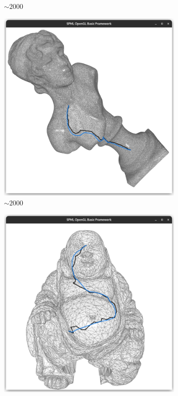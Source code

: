 \documentclass{stdlocal}
\begin{document}
\begin{figure}
\begin{subfigure}[b]{0.24\linewidth}
    \caption{$\sim 2000$}
  \end{subfigure}
  \begin{subfigure}[b]{0.24\linewidth}
    \centering
    \includegraphics[width=\linewidth,trim={15px 20 15 50},clip]{images/sappho-smooth-1.png}
    \caption{$\sim 2000$}
  \end{subfigure}
  \begin{subfigure}[b]{0.24\linewidth}
    \centering
    \includegraphics[width=\linewidth,trim={15px 20 15 50},clip]{images/buddha-smooth-1.png}

\end{subfigure}
\end{figure}
\end{document}
